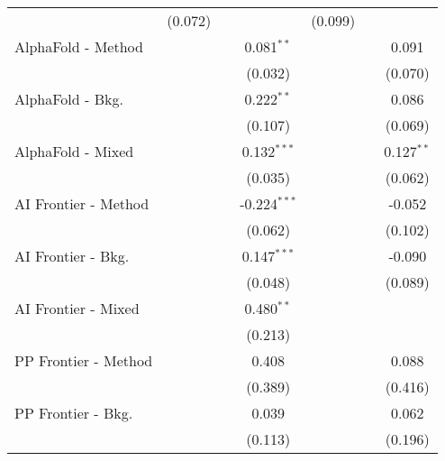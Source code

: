 \begin{tabular}{lcccccc}
                                  & (0.072)      &               &                & (0.099)       &         &   \\   
   AlphaFold - Method             &              &               & 0.081$^{**}$   &               &         & 0.091\\   
                                  &              &               & (0.032)        &               &         & (0.070)\\   
   AlphaFold - Bkg.               &              &               & 0.222$^{**}$   &               &         & 0.086\\   
                                  &              &               & (0.107)        &               &         & (0.069)\\   
   AlphaFold - Mixed              &              &               & 0.132$^{***}$  &               &         & 0.127$^{**}$\\   
                                  &              &               & (0.035)        &               &         & (0.062)\\   
   AI Frontier - Method           &              &               & -0.224$^{***}$ &               &         & -0.052\\   
                                  &              &               & (0.062)        &               &         & (0.102)\\   
   AI Frontier - Bkg.             &              &               & 0.147$^{***}$  &               &         & -0.090\\   
                                  &              &               & (0.048)        &               &         & (0.089)\\   
   AI Frontier - Mixed            &              &               & 0.480$^{**}$   &               &         &   \\   
                                  &              &               & (0.213)        &               &         &   \\   
   PP Frontier - Method           &              &               & 0.408          &               &         & 0.088\\   
                                  &              &               & (0.389)        &               &         & (0.416)\\   
   PP Frontier - Bkg.             &              &               & 0.039          &               &         & 0.062\\   
                                  &              &               & (0.113)        &               &         & (0.196)\\   

\end{tabular}

